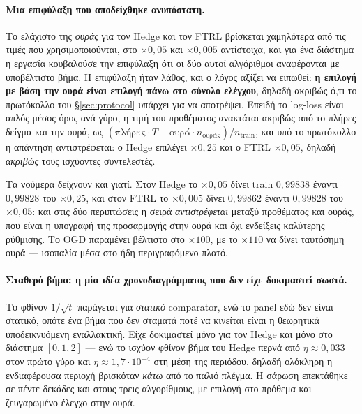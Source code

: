 \documentclass[12pt,a4paper,oneside]{report}
\renewcommand{\_}{\oldunderscore\allowbreak}
\theoremstyle{definition}
\theoremstyle{plain}
\theoremstyle{remark}
\begin{document}
\paragraph{Μια επιφύλαξη που αποδείχθηκε ανυπόστατη.} Το ελάχιστο της \emph{ουράς} για τον
Hedge και τον FTRL βρίσκεται χαμηλότερα από τις τιμές που χρησιμοποιούνται, στο
$\times 0{,}05$ και $\times 0{,}005$ αντίστοιχα, και για ένα διάστημα η εργασία κουβαλούσε την
επιφύλαξη ότι οι δύο αυτοί αλγόριθμοι αναφέρονται με υποβέλτιστο βήμα. Η επιφύλαξη ήταν λάθος,
και ο λόγος αξίζει να ειπωθεί: \textbf{η επιλογή με βάση την ουρά είναι επιλογή πάνω στο
σύνολο ελέγχου}, δηλαδή ακριβώς ό,τι το πρωτόκολλο του \S\ref{sec:protocol} υπάρχει για να
αποτρέψει. Επειδή το log-loss είναι απλός μέσος όρος ανά γύρο, η τιμή του προθέματος ανακτάται
ακριβώς από το πλήρες δείγμα και την ουρά, ως
$(\text{πλήρες}\cdot T - \text{ουρά}\cdot n_{\text{ουράς}})/n_{\text{train}}$, και υπό το
πρωτόκολλο η απάντηση αντιστρέφεται: ο Hedge επιλέγει $\times 0{,}25$ και ο FTRL
$\times 0{,}05$, δηλαδή \emph{ακριβώς} τους ισχύοντες συντελεστές.

Τα νούμερα δείχνουν και γιατί. Στον Hedge το $\times 0{,}05$ δίνει train $0{,}99838$ έναντι
$0{,}99828$ του $\times 0{,}25$, και στον FTRL το $\times 0{,}005$ δίνει $0{,}99862$ έναντι
$0{,}99828$ του $\times 0{,}05$: και στις δύο περιπτώσεις η σειρά \emph{αντιστρέφεται} μεταξύ
προθέματος και ουράς, που είναι η υπογραφή της προσαρμογής στην ουρά και όχι ενδείξεις
καλύτερης ρύθμισης. Το OGD παραμένει βέλτιστο στο $\times 100$, με το $\times 110$ να δίνει
ταυτόσημη ουρά --- ισοπαλία μέσα στο ήδη περιγραφόμενο πλατό.

\paragraph{Σταθερό βήμα: η μία ιδέα χρονοδιαγράμματος που δεν είχε δοκιμαστεί σωστά.} Το
φθίνον $1/\sqrt{t}$ παράγεται για \emph{στατικό} comparator, ενώ το panel εδώ δεν είναι
στατικό, οπότε ένα βήμα που δεν σταματά ποτέ να κινείται είναι η θεωρητικά υποδεικνυόμενη
εναλλακτική. Είχε δοκιμαστεί μόνο για τον Hedge και μόνο στο διάστημα $[0{,}1, 2]$ --- ενώ το
ισχύον φθίνον βήμα του Hedge περνά από $\eta \approx 0{,}033$ στον πρώτο γύρο και
$\eta \approx 1{,}7\cdot10^{-4}$ στη μέση της περιόδου, δηλαδή ολόκληρη η ενδιαφέρουσα περιοχή
βρισκόταν \emph{κάτω} από το παλιό πλέγμα. Η σάρωση επεκτάθηκε σε πέντε δεκάδες και στους
τρεις αλγορίθμους, με επιλογή στο πρόθεμα και ζευγαρωμένο έλεγχο στην ουρά.
\end{document}
